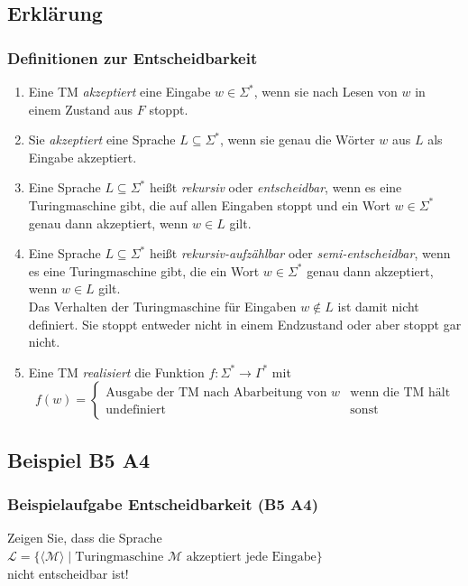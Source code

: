 \subsection{Erklärung}
\begin{frame}
	\frametitle{Definitionen zur Entscheidbarkeit}
	 \begin{enumerate}
  \item Eine TM \emph{akzeptiert} eine Eingabe $w \in \Sigma^*$, wenn sie nach Lesen von $w$ in einem Zustand aus $F$ stoppt.
  \item Sie \emph{akzeptiert} eine Sprache $L \subseteq \Sigma^*$, wenn sie genau die Wörter $w$ aus $L$ als Eingabe akzeptiert.
  \item Eine Sprache $L \subseteq \Sigma^*$ heißt \emph{rekursiv} oder \emph{entscheidbar}, wenn es eine Turingmaschine gibt, die auf allen Eingaben stoppt und
	ein Wort $w \in \Sigma^*$ genau dann akzeptiert, wenn $w \in L$ gilt.
\end{enumerate}
\end{frame}
\begin{frame}
 \begin{enumerate}
 \setcounter{enumi}{3}
  \item Eine Sprache $L \subseteq \Sigma^*$ heißt \emph{rekursiv-aufzählbar} oder \emph{semi-entscheidbar}, wenn es eine Turingmaschine gibt, die ein Wort $w \in \Sigma^*$ genau dann akzeptiert, wenn $w \in L$ gilt. \\ Das Verhalten der Turingmaschine für Eingaben $w \not\in L$ ist damit nicht definiert.
	Sie stoppt entweder nicht in einem Endzustand oder aber stoppt gar nicht.
	\item Eine TM \emph{realisiert} die Funktion $f: \Sigma^* \rightarrow \Gamma^*$ mit $$f(w) = \begin{cases} \text{Ausgabe der TM nach Abarbeitung von } w & \text{wenn die TM hält} \\ \text{undefiniert} & \text{sonst} \end{cases}$$
 \end{enumerate}
\end{frame}
\subsection{Beispiel B5 A4}
\begin{frame}
	\frametitle{Beispielaufgabe Entscheidbarkeit (B5 A4)}
	Zeigen Sie, dass die Sprache \\ $\mathcal{L} = \{ \langle \mathcal{M} \rangle \; | \; \mbox{Turingmaschine $\mathcal{M}$ akzeptiert jede Eingabe} \}$ \\ nicht entscheidbar ist!
\end{frame}
